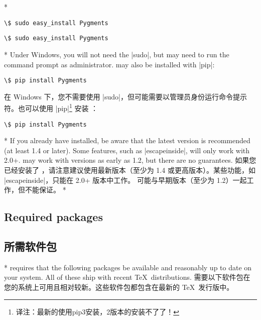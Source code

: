 \begin{paracol}{2}
\switchcolumn[0]*%
\begin{Verbatim}[commandchars=\\\{\}]
\$ sudo easy_install Pygments
\end{Verbatim}
\switchcolumn
\begin{Verbatim}[commandchars=\\\{\}]
\$ sudo easy_install Pygments
\end{Verbatim}
\switchcolumn[0]*%
Under Windows, you will not need the |sudo|, but may need to run the command prompt as administrator.   may also be installed with |pip|:
\begin{Verbatim}[commandchars=\\\{\}]
\$ pip install Pygments
\end{Verbatim}
\switchcolumn
在 Windows 下，您不需要使用 |sudo|，但可能需要以管理员身份运行命令提示符。也可以使用 |pip|\footnote{译注：最新的使用pip3安装，2版本的安装不了了！} 安装 ：
\begin{Verbatim}[commandchars=\\\{\}]
\$ pip install Pygments
\end{Verbatim}
\switchcolumn[0]*%
If you already have  installed, be aware that the latest version is recommended (at least 1.4 or later).  Some features, such as |escapeinside|, will only work with 2.0+.   may work with versions as early as 1.2, but there are no guarantees.
\switchcolumn
如果您已经安装了 ，请注意建议使用最新版本（至少为 1.4 或更高版本）。某些功能，如 |escapeinside|，只能在 2.0+ 版本中工作。 可能与早期版本（至少为 1.2）一起工作，但不能保证。
\switchcolumn[0]*%
\subsection{Required packages}
\switchcolumn
\subsection{所需软件包}
\switchcolumn[0]*%
 requires that the following packages be available and reasonably up to date on your system.  All of these ship with recent \TeX\ distributions.
\switchcolumn
{} 需要以下软件包在您的系统上可用且相对较新。这些软件包都包含在最新的 \TeX\ 发行版中。
\end{paracol}

